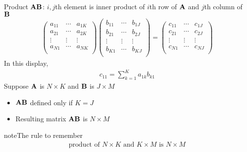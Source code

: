 \documentclass[letterpaper,10pt,english]{jupyterBook}
\begin{document}
\sphinxAtStartPar
{}

\sphinxAtStartPar
Product \({\bf A} {\bf B}\):
\(i,j\)\sphinxhyphen{}th element is inner product of \(i\)\sphinxhyphen{}th row of \({\bf A}\) and
\(j\)\sphinxhyphen{}th column of \({\bf B}\)
\begin{equation*}
\begin{split}
%
\left(
\begin{array}{ccc}
a_{11} & \cdots & a_{1K} \\
a_{21} & \cdots & a_{2K} \\
\vdots & \vdots & \vdots \\
a_{N1} & \cdots & a_{NK} \\
\end{array}
\right)
\left(
\begin{array}{ccc}
b_{11} & \cdots & b_{1J} \\
b_{21} & \cdots & b_{2J} \\
\vdots & \vdots & \vdots \\
b_{K1} & \cdots & b_{KJ} \\
\end{array}
\right)
=
\left(
\begin{array}{ccc}
c_{11} & \cdots & c_{1J} \\
c_{21} & \cdots & c_{2J} \\
\vdots & \vdots & \vdots \\
c_{N1} & \cdots & c_{NJ} \\
\end{array}
\right)
%
\end{split}
\end{equation*}
\sphinxAtStartPar
In this display,
\begin{equation*}
\begin{split}
%
c_{11} = \sum_{k=1}^K a_{1k} b_{k1}
%
\end{split}
\end{equation*}
\sphinxAtStartPar
Suppose \({\bf A}\) is \(N \times K\) and \({\bf B}\) is \(J \times M\)
\begin{itemize}
\item {} 
\sphinxAtStartPar
\({\bf A} {\bf B}\) defined only if \(K = J\)

\item {} 
\sphinxAtStartPar
Resulting matrix \({\bf A} {\bf B}\) is \(N \times M\)

\end{itemize}

\begin{sphinxadmonition}{note}{The rule to remember}
\begin{equation*}
\begin{split}
%
\text{product of } N \times K \text{ and } K \times M
\text{ is } N \times M
%
\end{split}
\end{equation*}\end{sphinxadmonition}
\end{document}
